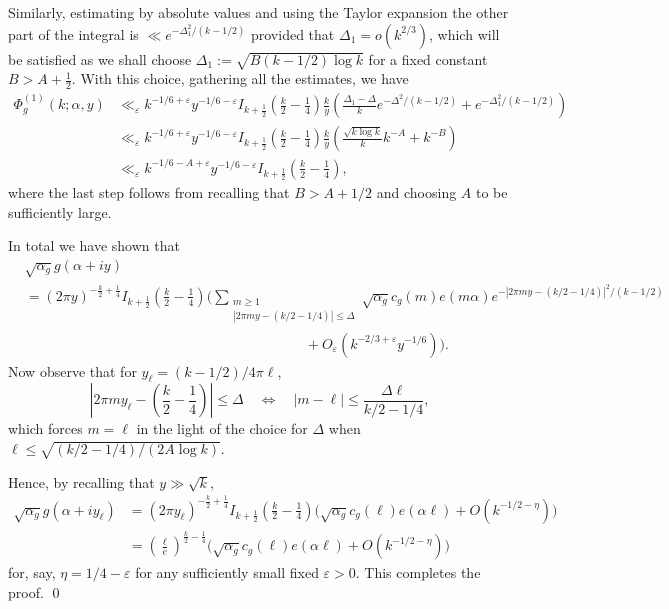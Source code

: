 \documentclass[a4paper,10pt,twoside]{amsart}
\theoremstyle{definition}
\numberwithin{equation}{section}
\newcommand\eps{\varepsilon}
\renewcommand\:{\colon}
\begin{document}
Similarly, estimating by absolute values and using the Taylor expansion the other part of the integral is $\ll e^{-\Delta_1^2/(k-1/2)}$ provided that $\Delta_1=o(k^{2/3})$, which will be satisfied as we shall choose $\Delta_1:=\sqrt{B(k-1/2)\log k}$ for a fixed constant $B>A+\frac12$. With this choice, gathering all the estimates, we have 
\begin{align*}
\Phi_g^{(1)}(k;\alpha,y)&\ll_\varepsilon k^{-1/6+\varepsilon}y^{-1/6-\eps}I_{k+\frac12}\left(\frac k2-\frac14\right)\frac ky\left(\frac{\Delta_1-\Delta}{k}e^{-\Delta^2/(k-1/2)}+e^{-\Delta_1^2/(k-1/2)}\right)\\
&\ll_\varepsilon k^{-1/6+\varepsilon}y^{-1/6-\eps}I_{k+\frac12}\left(\frac k2-\frac14\right)\frac ky\left(\frac{\sqrt{k\log k}}k k^{-A}+k^{-B}\right)\\
&\ll_\varepsilon k^{-1/6-A+\varepsilon}y^{-1/6-\eps}I_{k+\frac12}\left(\frac k2-\frac14\right),
\end{align*}
where the last step follows from recalling that $B>A+1/2$ and choosing $A$ to be sufficiently large.

In total we have shown that 
\begin{align*}
&\sqrt{\alpha_g}g(\alpha+iy)\\
&=(2\pi y)^{-\frac k2+\frac14}I_{k+\frac12}\left(\frac k2-\frac14\right)\bigg(\sum_{\substack{m\geq 1\\
|2\pi my-(k/2-1/4)|\leq\Delta}}\sqrt{\alpha_g}c_g(m)e(m\alpha)e^{-|2\pi my-(k/2-1/4)|^2/(k-1/2)}\\
&\qquad\qquad\qquad\qquad\qquad\qquad\qquad\qquad\qquad\qquad+O_\eps\left(k^{-2/3+\eps}y^{-1/6}\right)\bigg).
\end{align*}
Now observe that for $y_\ell=(k-1/2)/4\pi\ell$,
\[\left|2\pi my_\ell-\left(\frac k2-\frac14\right)\right|\leq\Delta\quad\Longleftrightarrow\quad|m-\ell|\leq\frac{\Delta\ell}{k/2-1/4},\]
which forces $m=\ell$ in the light of the choice for $\Delta$ when $\ell\leq\sqrt{(k/2-1/4)/(2A\log k)}$. 

Hence, by recalling that $y\gg\sqrt k$,
\begin{align*}
\sqrt{\alpha_g}g(\alpha+iy_\ell)&=(2\pi y_\ell)^{-\frac k2+\frac14}I_{k+\frac12}\left(\frac k2-\frac14\right)\bigg(\sqrt{\alpha_g}c_g(\ell)e(\alpha\ell)+O\left(k^{-1/2-\eta}\right)\bigg)\\
&=\left(\frac{\ell}e\right)^{\frac k2-\frac14}\bigg(\sqrt{\alpha_g}c_g(\ell)e(\alpha\ell)+O\left(k^{-1/2-\eta}\right)\bigg)
\end{align*}
for, say, $\eta=1/4-\eps$ for any sufficiently small fixed $\eps>0$. This completes the proof. \qed
\end{document}
